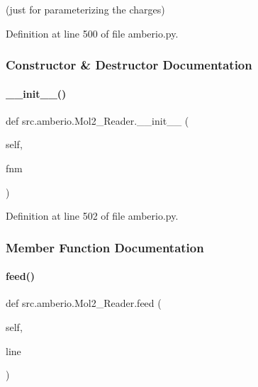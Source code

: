 (just for parameterizing the charges) 

Definition at line 500 of file amberio.\+py.



\subsubsection{Constructor \& Destructor Documentation}
\mbox{\label{classsrc_1_1amberio_1_1Mol2__Reader_a8ad64cfe46a30caa9cbc89473b9e72b5}} 
\paragraph{\texorpdfstring{\+\_\+\+\_\+init\+\_\+\+\_\+()}{\_\_init\_\_()}}
{\footnotesize\ttfamily def src.\+amberio.\+Mol2\+\_\+\+Reader.\+\_\+\+\_\+init\+\_\+\+\_\+ (\begin{DoxyParamCaption}\item[{}]{self,  }\item[{}]{fnm }\end{DoxyParamCaption})}



Definition at line 502 of file amberio.\+py.



\subsubsection{Member Function Documentation}
\mbox{\label{classsrc_1_1amberio_1_1Mol2__Reader_a1c4c0c9d26152464dcb3a45498f3417e}} 
\paragraph{\texorpdfstring{feed()}{feed()}}
{\footnotesize\ttfamily def src.\+amberio.\+Mol2\+\_\+\+Reader.\+feed (\begin{DoxyParamCaption}\item[{}]{self,  }\item[{}]{line }\end{DoxyParamCaption})}



